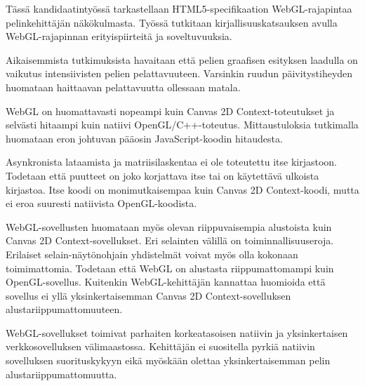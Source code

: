 \begin{fiabstract}
\raggedright
Tässä kandidaatintyössä tarkastellaan HTML5-specifikaation WebGL-rajapintaa pelinkehittäjän näkökulmasta. Työssä tutkitaan kirjallisuuskatsauksen avulla WebGL-rajapinnan erityispiirteitä ja soveltuvuuksia.

Aikaisemmista tutkimuksista havaitaan että pelien graafisen esityksen laadulla on vaikutus intensiivisten pelien pelattavuuteen. Varsinkin ruudun päivitystiheyden huomataan haittaavan pelattavuutta ollessaan matala. 

WebGL on huomattavasti nopeampi kuin Canvas 2D Context-toteutukset ja selvästi hitaampi kuin natiivi OpenGL/C++-toteutus. Mittaustuloksia tutkimalla huomataan eron johtuvan pääosin JavaScript-koodin hitaudesta.

Asynkronista lataamista ja matriisilaskentaa ei ole toteutettu itse kirjastoon. Todetaan että puutteet on joko korjattava itse tai on käytettävä ulkoista kirjastoa. Itse koodi on monimutkaisempaa kuin Canvas 2D Context-koodi, mutta ei eroa suuresti natiivista OpenGL-koodista.

WebGL-sovellusten huomataan myös olevan riippuvaisempia alustoista kuin Canvas 2D Context-sovellukset. Eri selainten välillä on toiminnallisuuseroja. Erilaiset selain-näytönohjain yhdistelmät voivat myös olla kokonaan toimimattomia. Todetaan että WebGL on alustasta riippumattomampi kuin OpenGL-sovellus. Kuitenkin WebGL-kehittäjän kannattaa huomioida että sovellus ei yllä yksinkertaisemman Canvas 2D Context-sovelluksen alustariippumattomuuteen.

WebGL-sovellukset toimivat parhaiten korkeatasoisen natiivin ja yksinkertaisen verkkosovelluksen välimaastossa. Kehittäjän ei suositella pyrkiä natiivin sovelluksen suorituskykyyn eikä myöskään olettaa yksinkertaisemman pelin alustariippumattomuutta.  
%
\end{fiabstract}